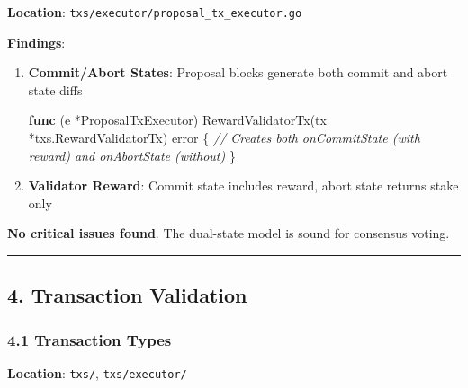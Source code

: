 \documentclass[
]{article}
\newenvironment{Shaded}{}{}
\newcommand{\CommentTok}[1]{\textcolor[rgb]{0.38,0.63,0.69}{\textit{#1}}}
\newcommand{\DataTypeTok}[1]{\textcolor[rgb]{0.56,0.13,0.00}{#1}}
\newcommand{\KeywordTok}[1]{\textcolor[rgb]{0.00,0.44,0.13}{\textbf{#1}}}
\newcommand{\NormalTok}[1]{#1}
\newcommand{\OperatorTok}[1]{\textcolor[rgb]{0.40,0.40,0.40}{#1}}
\begin{document}
\textbf{Location}: \texttt{txs/executor/proposal\_tx\_executor.go}

\textbf{Findings}:

\begin{enumerate}
\def\labelenumi{\arabic{enumi}.}
\item
  \textbf{Commit/Abort States}: Proposal blocks generate both commit and
  abort state diffs

\begin{Shaded}
\begin{Highlighting}[]
\KeywordTok{func} \OperatorTok{(}\NormalTok{e }\OperatorTok{*}\NormalTok{ProposalTxExecutor}\OperatorTok{)}\NormalTok{ RewardValidatorTx}\OperatorTok{(}\NormalTok{tx }\OperatorTok{*}\NormalTok{txs}\OperatorTok{.}\NormalTok{RewardValidatorTx}\OperatorTok{)} \DataTypeTok{error} \OperatorTok{\{}
    \CommentTok{// Creates both onCommitState (with reward) and onAbortState (without)}
\OperatorTok{\}}
\end{Highlighting}
\end{Shaded}
\item
  \textbf{Validator Reward}: Commit state includes reward, abort state
  returns stake only
\end{enumerate}

\textbf{No critical issues found}. The dual-state model is sound for
consensus voting.

\begin{center}\rule{0.5\linewidth}{0.5pt}\end{center}

\subsection{4. Transaction Validation}\label{4-transaction-validation}

\subsubsection{4.1 Transaction Types}\label{41-transaction-types}

\textbf{Location}: \texttt{txs/}, \texttt{txs/executor/}
\end{document}
